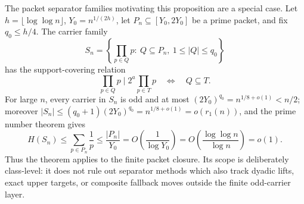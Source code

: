 The packet separator families motivating this proposition are a special case.
Let $h=\lfloor\log\log n\rfloor$, $Y_0=n^{1/(2h)}$, let
$P_n\subseteq[Y_0,2Y_0]$ be a prime packet, and fix $q_0\le h/4$.  The carrier
family
\[
  S_n=
  \left\{\prod_{p\in Q}p:\ Q\subseteq P_n,\ 1\le |Q|\le q_0\right\}
\]
has the support-covering relation
\[
  \prod_{p\in Q}p \mid 2^a\prod_{p\in T}p
  \quad\Longleftrightarrow\quad
  Q\subseteq T.
\]
For large $n$, every carrier in $S_n$ is odd and at most
$(2Y_0)^{q_0}=n^{1/8+o(1)}<n/2$; moreover
$|S_n|\le(q_0+1)(2Y_0)^{q_0}=n^{1/8+o(1)}=o(r_1(n))$, and the prime number
theorem gives
\[
  H(S_n)\le \sum_{p\in P_n}\frac1p
  \le \frac{|P_n|}{Y_0}
  =O\!\left(\frac1{\log Y_0}\right)
  =O\!\left(\frac{\log\log n}{\log n}\right)=o(1).
\]
Thus the theorem applies to the finite packet closure.  Its scope is
deliberately class-level: it does not rule out separator methods which also
track dyadic lifts, exact upper targets, or composite fallback moves outside
the finite odd-carrier layer.
